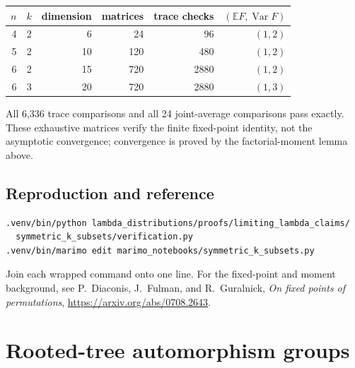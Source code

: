 \documentclass[10pt]{article}
\newcommand{\SMG}{\operatorname{SMG}}
\newcommand{\MGF}{\SMG}
\begin{document}
\begin{center}
\begin{tabular}{@{}rrrrrr@{}}\toprule
$n$&$k$&dimension&matrices&trace checks&$(\mathbb E F,\operatorname{Var}F)$\\\midrule
4&2&6&24&96&$(1,2)$\\
5&2&10&120&480&$(1,2)$\\
6&2&15&720&2880&$(1,2)$\\
6&3&20&720&2880&$(1,3)$\\\bottomrule
\end{tabular}
\end{center}
All 6,336 trace comparisons and all 24 joint-average comparisons pass exactly.
These exhaustive matrices verify the finite fixed-point identity, not the
asymptotic convergence; convergence is proved by the factorial-moment lemma
above.

\subsection{Reproduction and reference}
\begin{verbatim}
.venv/bin/python lambda_distributions/proofs/limiting_lambda_claims/
  symmetric_k_subsets/verification.py
.venv/bin/marimo edit marimo_notebooks/symmetric_k_subsets.py
\end{verbatim}
Join each wrapped command onto one line.  For the fixed-point and moment
background, see P.~Diaconis, J.~Fulman, and R.~Guralnick,
\emph{On fixed points of permutations},
\url{https://arxiv.org/abs/0708.2643}.
\endgroup


\clearpage
\section{Rooted-tree automorphism groups}\label{proof:rooted-trees}
\begingroup
{}
\providecommand{\MGF}{\SMG}
\renewcommand{\MGF}{\SMG}
\setcounter{theorem}{0}
\setcounter{proposition}{0}
\setcounter{lemma}{0}
\setcounter{corollary}{0}
\setcounter{remark}{0}
\begin{abstract}
We prove the exact recursive sigma--MGF law for automorphisms of any finite
rooted tree.  Explicit leaf-permutation matrix groups for complete binary
trees through height three and ternary trees through height two give 30 exact
mixed-coefficient comparisons.  The document separates this proved finite
recursion from the still-open general random-tree $\Lambda$-limit.
\end{abstract}
\end{document}
